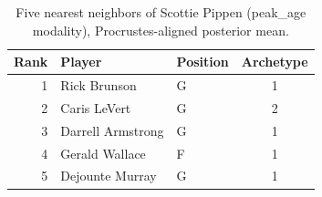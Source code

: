 \begin{table}[htbp]
  \centering\small
  \begin{tabular}{rllc}
    \toprule
    Rank & Player & Position & Archetype \\
    \midrule
    1 & Rick Brunson & G & 1 \\
    2 & Caris LeVert & G & 2 \\
    3 & Darrell Armstrong & G & 1 \\
    4 & Gerald Wallace & F & 1 \\
    5 & Dejounte Murray & G & 1 \\
    \bottomrule
  \end{tabular}
  \caption{Five nearest neighbors of Scottie Pippen (peak_age modality), Procrustes-aligned posterior mean.}
  \label{tab:Scottie_Pippen_neighbors_peak_age}
\end{table}

